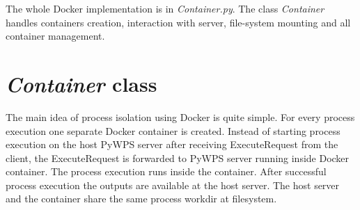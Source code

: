 \documentclass[12pt,a4paper]{article}
\begin{document}
\begin{figure}[h!]
\centering
\begin{floatrow}
\end{floatrow}
\end{figure}

\bigskip
The whole Docker implementation is in \textit{Container.py}. The class \textit{Container} handles containers creation, interaction with
server, file-system mounting and all container management.

\newpage
\section{\textit{Container} class}
The main idea of process isolation using Docker is quite simple. For every process execution one separate Docker container is created.
Instead of starting process execution on the host PyWPS server after receiving ExecuteRequest from the client, the ExecuteRequest is
forwarded to PyWPS server running inside Docker container. The process execution runs inside the container. After successful process
execution the outputs are available at the host server. The host server and the container share the same process workdir at filesystem.
\end{document}
